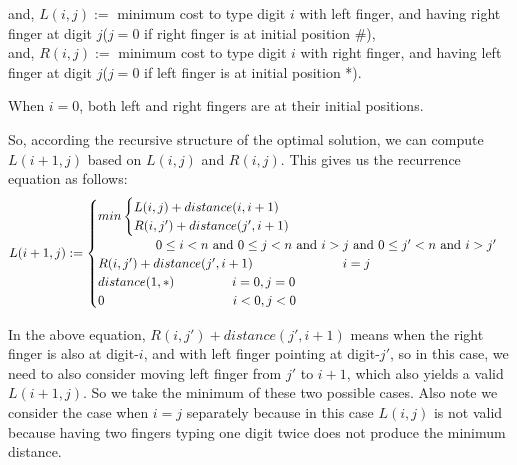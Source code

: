 \documentclass[11pt]{article}
\begin{document}
\begin{enumerate}
  and, $L(i,j) := $ minimum cost to type digit $i$ with left finger,
  and having right finger at digit $j$($j=0$ if right finger is at
  initial position \#),\\
  and, $R(i,j) := $ minimum cost to type digit $i$ with right finger,
  and having left finger at digit $j$($j=0$ if left finger is at
  initial position *).

  When $i=0$, both left and right fingers are at their initial positions.

  So, according the recursive structure of the optimal solution, we
  can compute $L(i+1, j)$ based on $L(i,j)$ and $R(i,j)$. This gives
  us the recurrence equation as follows:
  \begin{equation}
    L(i+1,j) := \begin{cases}
      min\begin{cases}
      L(i,j) + distance(i,i+1)\\
      R(i,j') + distance(j',i+1)\\
      \end{cases}\\
      \-\hspace{4.5em} 0 \leq i < n \text{ and } 0 \leq j < n
      \text{ and } i > j \text{ and } 0 \leq j' < n \text{ and } i >
      j'\\ 
      R(i,j') + distance(j',i+1) \-\hspace{7em} i = j\\
      distance(1, *) \-\hspace{4.5em} i = 0, j = 0\\
      0 \-\hspace{10em} i < 0, j < 0
    \end{cases}
  \end{equation}

  In the above equation, $R(i,j') + distance(j',i+1)$ means when the
  right finger is also at digit-$i$, and with left finger pointing at
  digit-$j'$, so in this case, we need to also consider moving left
  finger from $j'$ to $i+1$, which also yields a valid $L(i+1,j)$. So
  we take the minimum of these two possible cases. Also note we
  consider the case when $i=j$ separately because in this case
  $L(i,j)$ is not valid because having two fingers typing one digit
  twice does not produce the minimum distance.


\end{enumerate}
\end{document}
